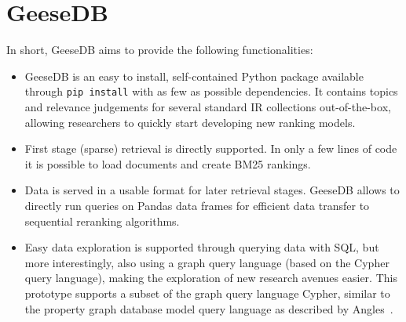 \section{GeeseDB}
In short, GeeseDB aims to provide the following functionalities:
\begin{itemize}
	\item GeeseDB is an easy to install, self-contained Python package available through \texttt{pip install} with as few as possible dependencies. It contains topics and relevance judgements for several standard IR collections out-of-the-box, allowing researchers to quickly start developing new ranking models. 
	\item First stage (sparse) retrieval is directly supported. In only a few lines of code it is possible to load documents and create BM25 rankings. 
	\item Data is served in a usable format for later retrieval stages. GeeseDB allows to directly run queries on Pandas data frames for efficient data transfer to sequential reranking algorithms.
	\item Easy data exploration is supported through querying data with SQL, but more interestingly, also using a graph query language (based on the Cypher query language), making the exploration of new research avenues easier. This prototype supports a subset of the graph query language Cypher, similar to the property graph database model query language as described by Angles~\cite{angles2018property}.
\end{itemize}


